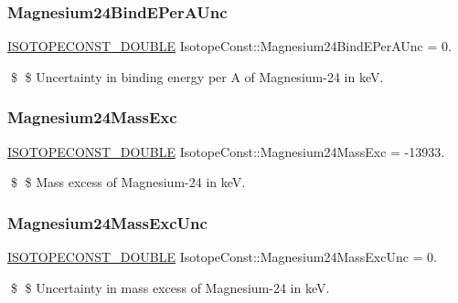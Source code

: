 \subsubsection{\texorpdfstring{Magnesium24\+Bind\+E\+Per\+A\+Unc}{Magnesium24BindEPerAUnc}}
{\footnotesize\ttfamily \mbox{\hyperlink{group___isotope_const-_macros_ga8f45a7272ce02c0b4c65c44636ed719a}{I\+S\+O\+T\+O\+P\+E\+C\+O\+N\+S\+T\+\_\+\+D\+O\+U\+B\+LE}} Isotope\+Const\+::\+Magnesium24\+Bind\+E\+Per\+A\+Unc = 0.}

\$ \$ Uncertainty in binding energy per A of Magnesium-\/24 in keV. \mbox{\label{group___isotope_const-_magnesium-_mg24_ga892bbc57bb25200d840a534b03dd3cb8}} 
\subsubsection{\texorpdfstring{Magnesium24\+Mass\+Exc}{Magnesium24MassExc}}
{\footnotesize\ttfamily \mbox{\hyperlink{group___isotope_const-_macros_ga8f45a7272ce02c0b4c65c44636ed719a}{I\+S\+O\+T\+O\+P\+E\+C\+O\+N\+S\+T\+\_\+\+D\+O\+U\+B\+LE}} Isotope\+Const\+::\+Magnesium24\+Mass\+Exc = -\/13933.}

\$ \$ Mass excess of Magnesium-\/24 in keV. \mbox{\label{group___isotope_const-_magnesium-_mg24_ga1f201d6c66be1b144554aa6cb5fcae29}} 
\subsubsection{\texorpdfstring{Magnesium24\+Mass\+Exc\+Unc}{Magnesium24MassExcUnc}}
{\footnotesize\ttfamily \mbox{\hyperlink{group___isotope_const-_macros_ga8f45a7272ce02c0b4c65c44636ed719a}{I\+S\+O\+T\+O\+P\+E\+C\+O\+N\+S\+T\+\_\+\+D\+O\+U\+B\+LE}} Isotope\+Const\+::\+Magnesium24\+Mass\+Exc\+Unc = 0.}

\$ \$ Uncertainty in mass excess of Magnesium-\/24 in keV. \mbox{\label{group___isotope_const-_magnesium-_mg24_ga85c0d5a9a8139d8fe95ed02cc2f025bc}} 
